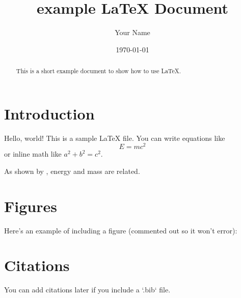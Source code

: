 \documentclass[12pt,a4paper]{article}
\title{example LaTeX Document}
\author{Your Name}
\date{\today}
\begin{document}
\maketitle

\begin{abstract}
This is a short example document to show how to use \LaTeX{}.
\end{abstract}

\section{Introduction}
Hello, world! This is a sample \LaTeX{} file.  
You can write equations like
\[
E = mc^2
\]
or inline math like $a^2 + b^2 = c^2$.

As shown by \citet{einstein1905}, energy and mass are related.

\section{Figures}
Here’s an example of including a figure (commented out so it won’t error):


\section{Citations}
You can add citations later if you include a `.bib` file.



\end{document}
